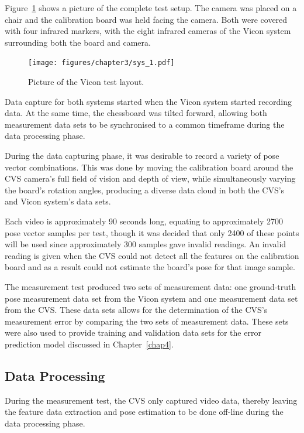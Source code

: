 Figure~\ref{fig:chap3-pic-sys-layout} shows a picture of the complete test setup. The camera was placed on a chair and the calibration board was held facing the camera. Both were covered with four infrared markers, with the eight infrared cameras of the Vicon system surrounding both the board and camera.  

\begin{figure}
  \centering
  \texttt{[image: figures/chapter3/sys\_1.pdf]}
  \caption{Picture of the Vicon test layout.}
\label{fig:chap3-pic-sys-layout}
\end{figure}

Data capture for both systems started when the Vicon system started recording data. At the same time, the chessboard was tilted forward, allowing both measurement data sets to be synchronised to a common timeframe during the data processing phase. 

During the data capturing phase, it was desirable to record a variety of pose vector combinations. This was done by moving the calibration board around the CVS camera's full field of vision and depth of view, while simultaneously varying the board's rotation angles, producing a diverse data cloud in both the CVS's and Vicon system's data sets. 

Each video is approximately 90 seconds long, equating to approximately 2700 pose vector samples per test, though it was decided that only 2400 of these points will be used since approximately 300 samples gave invalid readings. An invalid reading is given when the CVS could not detect all the features on the calibration board and as a result could not estimate the board's pose for that image sample.  

The measurement test produced two sets of measurement data: one ground-truth pose measurement data set from the Vicon system and one measurement data set from the CVS\@. These data sets allows for the determination of the CVS's measurement error by comparing the two sets of measurement data. These sets were also used to provide training and validation data sets for the error prediction model discussed in Chapter~\ref{chap4}. 

\subsection{Data Processing}

During the measurement test, the CVS only captured video data, thereby leaving the feature data extraction and pose estimation to be done off-line during the data processing phase. 

